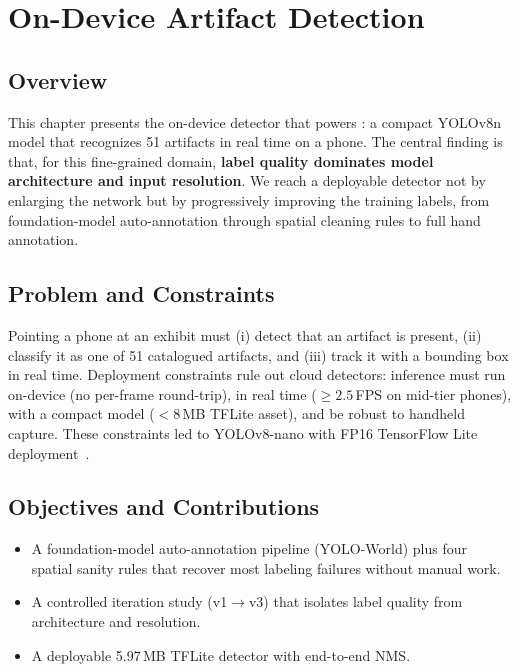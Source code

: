 \chapter{On-Device Artifact Detection}

\section{Overview}

This chapter presents the on-device detector that powers \TimeLens{}: a compact
YOLOv8n model that recognizes 51 \GEM{} artifacts in real time on a phone. The central
finding is that, for this fine-grained domain, \textbf{label quality dominates model
architecture and input resolution}. We reach a deployable detector not by enlarging
the network but by progressively improving the training labels, from foundation-model
auto-annotation through spatial cleaning rules to full hand annotation.

\section{Problem and Constraints}

Pointing a phone at an exhibit must (i) detect that an artifact is present, (ii)
classify it as one of 51 catalogued artifacts, and (iii) track it with a bounding box
in real time. Deployment constraints rule out cloud detectors: inference must run
on-device (no per-frame round-trip), in real time ($\geq 2.5$\,FPS on mid-tier
phones), with a compact model ($<8$\,MB TFLite asset), and be robust to handheld
capture. These constraints led to YOLOv8-nano with FP16 TensorFlow Lite
deployment~\citep{yolov8,ipalakova2025comparative}.

\section{Objectives and Contributions}

\begin{itemize}[leftmargin=1.5em]
  \item A foundation-model auto-annotation pipeline (YOLO-World) plus four spatial
        sanity rules that recover most labeling failures without manual work.
  \item A controlled iteration study (v1$\rightarrow$v3) that isolates label quality
        from architecture and resolution.
  \item A deployable 5.97\,MB TFLite detector with end-to-end NMS.
\end{itemize}


